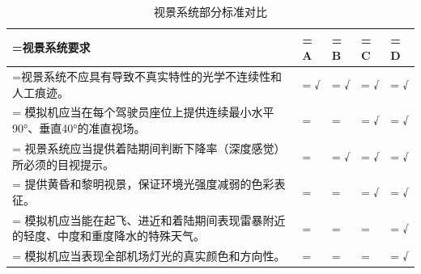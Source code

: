 \begin{table}[h!]
    \begin{center}
        \caption{视景系统部分标准对比}
        \label{viscomp}
        \renewcommand\arraystretch{1.2}
        \begin{tabularx}{\textwidth}{ 
            | >{\centering\arraybackslash\hsize=0.5\hsize\linewidth=\hsize}X 
            | >{\centering\arraybackslash\hsize=0.125\hsize\linewidth=\hsize}X 
            | >{\centering\arraybackslash\hsize=0.125\hsize\linewidth=\hsize}X 
            | >{\centering\arraybackslash\hsize=0.125\hsize\linewidth=\hsize}X 
            | >{\centering\arraybackslash\hsize=0.125\hsize\linewidth=\hsize}X 
            | }
            \hline
            \textbf{视景系统要求} & \textbf{A} & \textbf{B} & \textbf{C} & \textbf{D}\\
            \hline
            视景系统不应具有导致不真实特性的光学不连续性和人工痕迹。 & √ & √ & √ & √\\
            \hline
            模拟机应当在每个驾驶员座位上提供连续最小水平90°、垂直40°的准直视场。 & & & √ & √\\
            \hline
            视景系统应当提供着陆期间判断下降率（深度感觉）所必须的目视提示。 & & √ & √ & √\\
            \hline
            提供黄昏和黎明视景，保证环境光强度减弱的色彩表征。 & & & √ & √\\
            \hline
            模拟机应当能在起飞、进近和着陆期间表现雷暴附近的轻度、中度和重度降水的特殊天气。 & & & & √\\
            \hline
            模拟机应当表现全部机场灯光的真实颜色和方向性。 & & & & √\\
            \hline
        \end{tabularx}
    \end{center}
\end{table}
